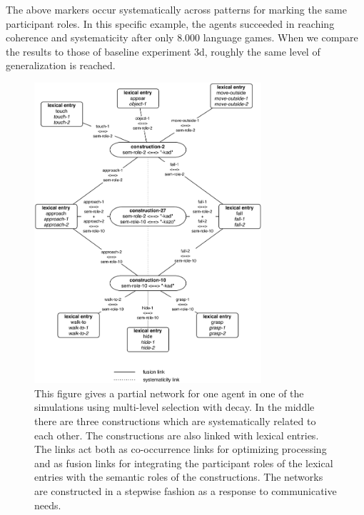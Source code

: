The above markers occur systematically across patterns for marking the same parti\-ci\-pant roles. In this specific example, the agents succeeded in reaching coherence and systematicity after only 8.000 language games. When we compare the results to those of baseline experiment 3d, roughly the same level of generalization is reached.

\begin{figure}[p]
\centerline{\includegraphics[width=0.75\textwidth]{Chapter4/figs/network}}
  \caption[Experiment 3: a partial network of set-up 5]{This figure gives a partial network for one agent in one of the simulations using multi-level selection with decay. In the middle there are three constructions which are systematically related to each other. The constructions are also linked with lexical entries. The links act both as co-occurrence links for optimizing processing and as fusion links for integrating the participant roles of the lexical entries with the semantic roles of the constructions. The networks are constructed in a stepwise fashion as a response to communicative needs.}
   \label{f:network}
\end{figure}

